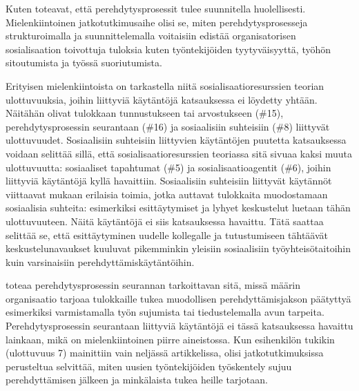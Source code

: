 \documentclass[utf8]{gradu3}
\begin{document}
Kuten \textcite{britto-ym-2020} toteavat, että perehdytysprosessit tulee suunnitella huolellisesti. Mielenkiintoinen jatkotutkimusaihe olisi se, miten perehdytysprosesseja strukturoimalla ja suunnittelemalla voitaisiin edistää organisatorisen sosialisaation toivottuja tuloksia kuten työntekijöiden tyytyväisyyttä, työhön sitoutumista ja työssä suoriutumista.

Erityisen mielenkiintoista on tarkastella niitä sosialisaatioresurssien teorian ulottuvuuksia, joihin liittyviä käytäntöjä katsauksessa ei löydetty yhtään. Näitähän olivat tulokkaan tunnustukseen tai arvostukseen (\#15), perehdytysprosessin seurantaan (\#16) ja sosiaalisiin suhteisiin (\#8) liittyvät ulottuvuudet. Sosiaalisiin suhteisiin liittyvien käytäntöjen puutetta katsauksessa voidaan selittää sillä, että sosialisaatioresurssien teoriassa sitä sivuaa kaksi muuta ulottuvuutta: sosiaaliset tapahtumat (\#5) ja sosialisaatioagentit (\#6), joihin liittyviä käytäntöjä kyllä havaittiin. Sosiaalisiin suhteisiin liittyvät käytännöt viittaavat \textcite{wanberg-2012} mukaan erilaisia toimia, jotka auttavat tulokkaita muodostamaan sosiaalisia suhteita: esimerkiksi esittäytymiset ja lyhyet keskustelut luetaan tähän ulottuvuuteen. Näitä käytäntöjä ei siis katsauksessa havaittu. Tätä saattaa selittää se, että esittäytyminen uudelle kollegalle ja tutustumiseen tähtäävät keskustelunavaukset kuuluvat pikemminkin yleisiin sosiaalisiin työyhteisötaitoihin kuin varsinaisiin perehdyttämiskäytäntöihin. 

\textcite{wanberg-2012} toteaa perehdytysprosessin seurannan tarkoittavan sitä, missä määrin organisaatio tarjoaa tulokkaille tukea muodollisen perehdyttämisjakson päätyttyä esimerkiksi varmistamalla työn sujumista tai tiedustelemalla avun tarpeita. Perehdytysprosessin seurantaan liittyviä käytäntöjä ei tässä katsauksessa havaittu lainkaan, mikä on mielenkiintoinen piirre aineistossa. Kun esihenkilön tukikin (ulottuvuus 7) mainittiin vain neljässä artikkelissa, olisi jatkotutkimuksissa perusteltua selvittää, miten uusien työntekijöiden työskentely sujuu perehdyttämisen jälkeen ja minkälaista tukea heille tarjotaan.
\end{document}
